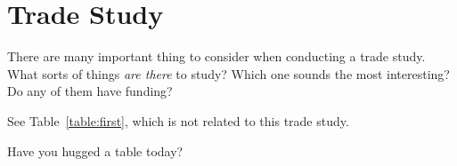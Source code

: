 \chapter{Trade Study}
There are many important thing to consider when conducting a trade study.
What sorts of things \textit{are there} to study?
Which one sounds the most interesting?
Do any of them have funding?

See Table~\ref{table:first}, which is not related to this trade study.

\begin{table}[b]
    \centering
    \caption[Tables are important]{Have you hugged a table today?}
    \label{table:first}
\end{table}
